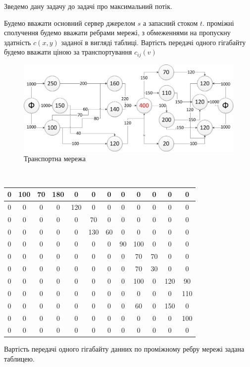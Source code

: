 \documentclass[a4paper,14pt,russian,ukrainian,oneside,final]{extreport}
\begin{document}
\indent
Зведемо дану задачу до задачі про максимальний потік.
\par Будемо вважати основний сервер джерелом $s$ а запасний стоком $t$. проміжні сполучення будемо вважати ребрами мережі, з обмеженнями на пропускну здатність $c(x,y)$ заданої в вигляді таблиці.
 Вартість передачі одного гігабайту будемо вважати ціною за транспортування $c_{ij}(v)$
\begin{figure}[h]
\begin{center}
\includegraphics[scale=0.60]{p2.jpg}
\caption{Транспортна мережа}
\end{center}
\end{figure}
\\
\begin{center}
\begin{tabular}{|c|c|c|c|c|c|c|c|c|c|c|c|}
\hline
0&100&70&180&0&0&0&0&0&0&0&0 \\ \hline
0&0&0&0&120&0&0&0&0&0&0&0 \\ \hline
0&0&0&0&0&70&0&0&0&0&0&0 \\ \hline
0&0&0&0&0&130&60&0&0&0&0&0 \\ \hline
0&0&0&0&0&0&0&90&100&0&0&0 \\ \hline
0&0&0&0&0&0&0&0&70&70&0&0 \\ \hline
0&0&0&0&0&0&0&0&70&30&0&0 \\ \hline
0&0&0&0&0&0&0&0&100&0&120&90 \\ \hline
0&0&0&0&0&0&0&0&0&0&0&110 \\ \hline
0&0&0&0&0&0&0&0&60&0&150&0 \\ \hline
0&0&0&0&0&0&0&0&0&0&0&100 \\ \hline
0&0&0&0&0&0&0&0&0&0&0&0 \\ \hline
\end{tabular}
\end{center}
Вартість передачі одного гігабайту данних по проміжному ребру мережі задана таблицею.
\end{document}

